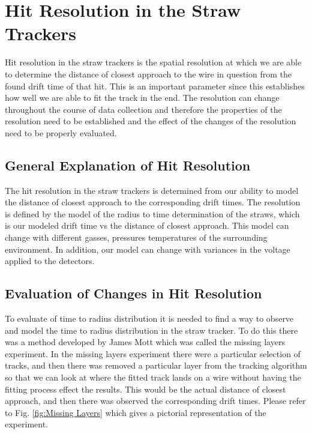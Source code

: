 \documentclass[./Thesis]{subfiles}
\begin{document}
\section{Hit Resolution in the Straw Trackers}
	Hit resolution in the straw trackers is the spatial resolution at which we are able to determine the distance of closest approach to the wire in question from the found drift time of that hit. This is an important parameter since this establishes how well we are able to fit the track in the end.  The resolution can change throughout the course of data collection and therefore the properties of the resolution need to be established and the effect of the changes of the resolution need to be properly evaluated.

\subsection{General Explanation of Hit Resolution}

	The hit resolution in the straw trackers is determined from our ability to model the distance of closest approach to the corresponding drift times. The resolution is defined by the model of the radius to time determination of the straws, which is our modeled drift time vs the distance of closest approach. This model can change with different gasses, pressures temperatures of the surrounding environment. In addition, our model can change with variances in the voltage applied to the detectors.

\subsection{Evaluation of Changes in Hit Resolution}

To evaluate of time to radius distribution it is needed to find a way to observe and model the time to radius distribution in the straw tracker. To do this there was a method developed by James Mott \cite{jMottmiss} which was called the missing layers experiment. In the missing layers experiment there were a  particular selection of tracks, and then there was removed a particular layer from the tracking algorithm so that we can look at where the fitted track lands on a wire without having the fitting process effect the results. This would be the actual distance of closest approach, and then there was observed the corresponding drift times. Please refer to Fig. \ref{fig:Missing Layers} which gives a pictorial representation of the experiment.
\end{document}
